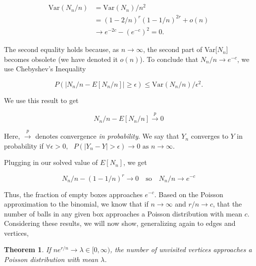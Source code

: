 \documentclass[11pt]{article}
\newtheorem{thm}{Theorem}[section]
\begin{document}
\begin{align*}
\text{Var}(N_{n}/n)  &= \text{Var}(N_{n})/n^{2} \\
&= (1 - 2/n)^{r} (1 - 1/n)^{2r}  + o(n) \\
&\to e^{-2c} - (e^{-c})^{2} = 0.
\end{align*}

The second equality holds because, as $n \to \infty$, the second part of Var[$N_{n}$] becomes obsolete (we have denoted it $o(n)$). To conclude that $N_{n}/n \to e^{-c}$, we use Chebyshev's Inequality 

\begin{equation}
P(\vert N_{n}/n - E[N_{n}/n]\vert \ge \epsilon) \le \text{Var}(N_{n}/n)/\epsilon^{2}.
\end{equation}

\noindent We use this 
result to get

\begin{equation}
{N_{n}/n - E[N_{n}/n]} \xrightarrow{p} 0
\end{equation}

\noindent Here, $\xrightarrow{p}$ denotes convergence \textit{in probability}. We say that $Y_{n}$ converges to $Y$ in probability if $\forall \epsilon > 0, \text{ }P(\vert Y_{n} - Y \vert > \epsilon) \to 0  \text{ as } n \to \infty$. 
\medbreak

\noindent Plugging in our solved value of $E[N_{n}]$, we get

\begin{equation}
N_{n}/n - (1 - 1/n)^{r} \to 0 \quad \text{so} \quad N_{n}/n \to e^{-c}
\end{equation}

Thus, the fraction of empty boxes approaches $e^{-c}$. Based on the Poisson approximation to the binomial, we know that if $n \to \infty$ and $r/n \to c$,  that the number of balls in any given box approaches a Poisson distribution with mean $c$. Considering these results, we will now show, generalizing again to edges and vertices, 

\begin{thm}
If $ne^{r/n} \to \lambda \in [0, \infty)$, the number of unvisited vertices approaches a Poisson distribution with mean $\lambda$.
\label{thm:poisson}
\end{thm}
\end{document}

